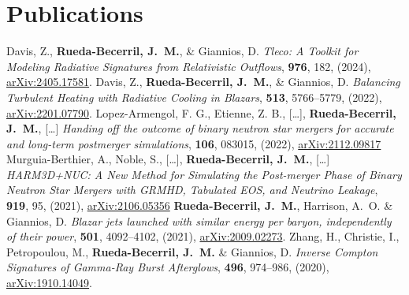 \section{Publications}

\renewcommand{\refname}{Articles}
\setcounter{num}{0}
\renewcommand{\MyNbOfPub}{9}%
\renewcommand*{\bibliographyitemlabel}{[\arabic{enumiv}]}
\begin{thebibliography}{99}
   Davis, Z., \textbf{Rueda-Becerril, J.~M.}, \& Giannios, D. \textit{Tleco: A Toolkit for Modeling Radiative Signatures from Relativistic Outflows}, \href{https://doi.org/10.3847/1538-4357/ad8bc2}{\apj} \textbf{976}, 182, (2024), \href{https://arxiv.org/abs/2405.17581}{arXiv:2405.17581}.
   Davis, Z., \textbf{Rueda-Becerril, J.~M.}, \& Giannios, D. \textit{Balancing Turbulent Heating with Radiative Cooling in Blazars}, \href{https://doi.org/10.1093/mnras/stac1282}{\mnras} \textbf{513}, 5766--5779, (2022), \href{https://arxiv.org/abs/2201.07790}{arXiv:2201.07790}.
   Lopez-Armengol, F. G., Etienne, Z. B., [\ldots], \textbf{Rueda-Becerril, J.~M.}, [\ldots] \textit{Handing off the outcome of binary neutron star mergers for accurate and long-term postmerger simulations}, \href{https://doi.org/10.1103/PhysRevD.106.083015}{\prd} \textbf{106}, 083015, (2022), \href{https://arxiv.org/abs/2112.09817}{arXiv:2112.09817}
   Murguia-Berthier, A., Noble, S., [\ldots], \textbf{Rueda-Becerril, J.~M.}, [\ldots] \textit{HARM3D+NUC: A New Method for Simulating the Post-merger Phase of Binary Neutron Star Mergers with GRMHD, Tabulated EOS, and Neutrino Leakage}, \href{https://doi.org/10.3847/1538-4357/ac1119}{\apj} \textbf{919}, 95, (2021), \href{https://arxiv.org/abs/2106.05356}{arXiv:2106.05356}
   \textbf{Rueda-Becerril, J.~M.}, Harrison, A.~O. \& Giannios, D. \textit{Blazar jets launched with similar energy per baryon, independently of their power}, \href{https://doi.org/10.1093/mnras/staa3925}{\mnras} \textbf{501}, 4092--4102, (2021), \href{https://arxiv.org/abs/2009.02273}{arXiv:2009.02273}.
   Zhang, H., Christie, I., Petropoulou, M., \textbf{Rueda-Becerril, J.~M.} \& Giannios, D. \textit{Inverse Compton Signatures of Gamma-Ray Burst Afterglows}, \href{https://doi.org/10.1093/mnras/staa1583}{\mnras} \textbf{496}, 974--986, (2020), \href{https://arxiv.org/abs/1910.14049}{arXiv:1910.14049}.

\end{thebibliography}
